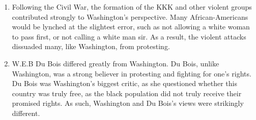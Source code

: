 \documentclass[12pt]{article}
\begin{document}
\begin{enumerate}
\begin{enumerate}
      \item Following the Civil War, the formation of the KKK and other violent groups contributed strongly to Washington's perspective. Many African-Americans would be lynched at the slightest error, such as not allowing a white woman to pass first, or not calling a white man sir. As a result, the violent attacks dissuaded many, like Washington, from protesting.

      \item W.E.B Du Bois differed greatly from Washington. Du Bois, unlike Washington, was a strong believer in protesting and fighting for one's rights. Du Bois was Washington's biggest critic, as she questioned whether this country was truly free, as the black population did not truly receive their promised rights. As such, Washington and Du Bois's views were strikingly different.

    \end{enumerate}

\end{enumerate}
\end{document}
